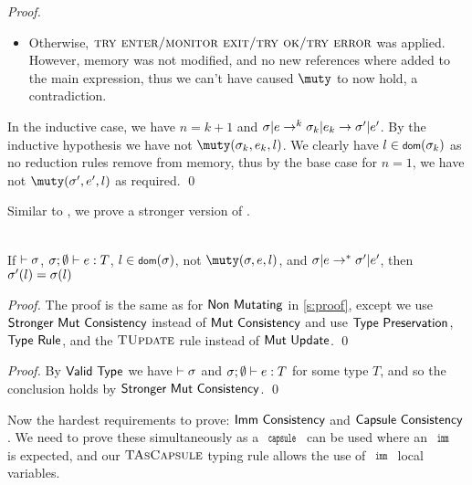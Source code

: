 \begin{proof}
\begin{itemize}
		\item Otherwise, $\textsc{try enter/monitor exit/try ok/try error}$
		was applied. However, memory was not modified, and no new references
		where added to the main expression, thus we can't have caused $\muty$
		to now hold, a contradiction.
	\end{itemize}
	
	In the inductive case, we have
	$n = k+1$ and $\sigma|e\rightarrow^{k}\sigma_k|e_k\rightarrow\sigma'|e'$. By the inductive hypothesis
	we have not $\muty(\s_k,e_k,l)$. We clearly have $l\in\dom(\s_k)$
	as no reduction rules remove from memory, thus by the base case for
	$n = 1$, we have not $\muty(\s',e',l)$ as required.
\qed\end{proof}

\LS

Similar to , we prove a stronger version of .

\SS\begin{Corollary}\ \\
	\indent If $\vdash\sigma$, $\tyr eT$, $l\in\dom(\s)$, not $\muty(\s,e,l)$,
	and $\sigma|e\rightarrow^*\sigma'|e'$, then $\sigma'(l) = \sigma(l)$
\end{Corollary}
\SS\begin{proof}
	The proof is the same as for $\textsf{Non Mutating}$ in \autoref{s:proof},
	except we use $\textsf{Stronger Mut Consistency}$ instead of $\textsf{Mut Consistency}$
	and use $\textsf{Type Preservation}$, $\textsf{Type Rule}$, and the
	$\textsc{TUpdate}$ rule instead of $\textsf{Mut Update}$.
\qed\end{proof}

\setcounter{requirement}{2}
\SS\REQMutCons
\SS\begin{proof}
	By $\textsf{Valid Type}$ we have $\vdash\sigma$ and $\tyr eT$ for some
	type $T$, and so the conclusion holds by $\textsf{Stronger Mut Consistency}$.
\qed\end{proof}

\LS

Now the hardest requirements to prove: $\textsf{Imm Consistency}$ and $\textsf{Capsule Consistency}$.
We need to prove these simultaneously as a $\Kw{capsule}$ can be used where an $\Kw{imm}$ is expected, and our $\textsc{TAsCapsule}$ typing rule allows the use of $\Kw{imm}$ local variables.

